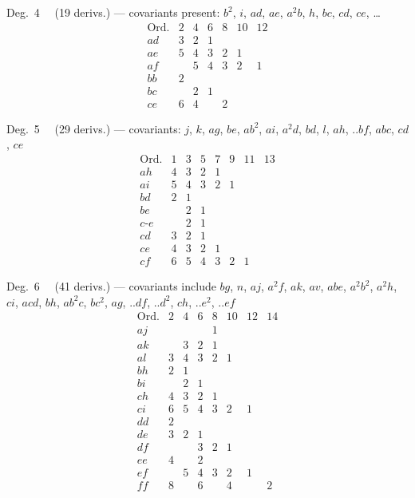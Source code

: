 \documentclass[11pt]{article}
\begin{document}
\medskip

\noindent Deg.\ 4 \ \ (19 derivs.) --- covariants present: $b^{2}$, $i$, $ad$, $ae$, $a^{2}b$, $h$, $bc$, $cd$, $ce$, \ldots
\[
\begin{array}{l|cccccc}
\text{Ord.} & 2 & 4 & 6 & 8 & 10 & 12 \\\hline
ad & 3 & 2 & 1 & & & \\
ae & 5 & 4 & 3 & 2 & 1 & \\
af & & 5 & 4 & 3 & 2 & 1 \\
bb & 2 & & & & & \\
bc & & 2 & 1 & & & \\
ce & 6 & 4 & & 2 & &
\end{array}
\]

\medskip

\noindent Deg.\ 5 \ \ (29 derivs.) --- covariants: $j$, $k$, $ag$, $be$, $ab^{2}$, $ai$, $a^{2}d$, $bd$, $l$, $ah$, $..bf$, $abc$, $cd$, $ce$
\[
\begin{array}{l|ccccccc}
\text{Ord.} & 1 & 3 & 5 & 7 & 9 & 11 & 13 \\\hline
ah & 4 & 3 & 2 & 1 & & & \\
ai & 5 & 4 & 3 & 2 & 1 & & \\
bd & 2 & 1 & & & & & \\
be & & 2 & 1 & & & & \\
c\text{-}e & & 2 & 1 & & & & \\
cd & 3 & 2 & 1 & & & & \\
ce & 4 & 3 & 2 & 1 & & & \\
cf & 6 & 5 & 4 & 3 & 2 & 1 &
\end{array}
\]

\medskip

\noindent Deg.\ 6 \ \ (41 derivs.) --- covariants include $bg$, $n$, $aj$, $a^{2}f$, $ak$, $av$, $abe$, $a^{2}b^{2}$, $a^{2}h$, $ci$, $acd$, $bh$, $ab^{2}c$, $bc^{2}$, $ag$, $..df$, $..d^{2}$, $ch$, $..e^{2}$, $..ef$
\[
\begin{array}{l|ccccccc}
\text{Ord.} & 2 & 4 & 6 & 8 & 10 & 12 & 14 \\\hline
aj & & & & 1 & & & \\
ak & & 3 & 2 & 1 & & & \\
al & 3 & 4 & 3 & 2 & 1 & & \\
bh & 2 & 1 & & & & & \\
bi & & 2 & 1 & & & & \\
ch & 4 & 3 & 2 & 1 & & & \\
ci & 6 & 5 & 4 & 3 & 2 & 1 & \\
dd & 2 & & & & & & \\
de & 3 & 2 & 1 & & & & \\
df & & & 3 & 2 & 1 & & \\
ee & 4 & & 2 & & & & \\
ef & & 5 & 4 & 3 & 2 & 1 & \\
ff & 8 & & 6 & & 4 & & 2
\end{array}
\]
\end{document}
